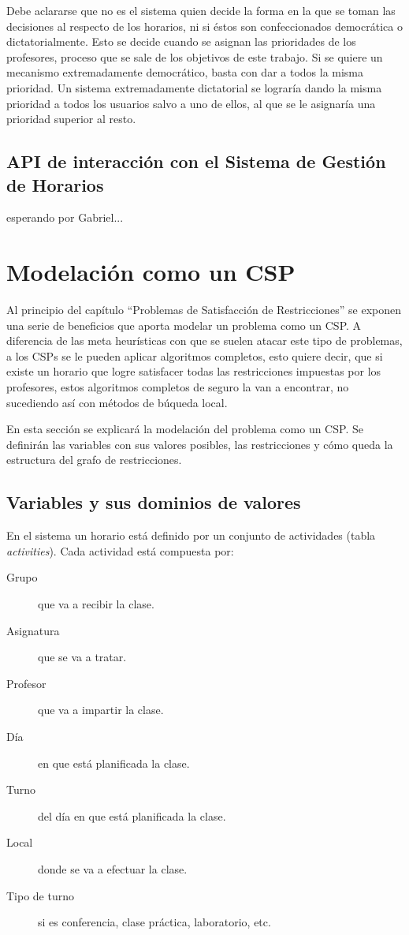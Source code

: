 Debe aclararse que no es el sistema quien decide la forma en la que se toman las decisiones al respecto de los horarios, ni si éstos son confeccionados democrática o dictatorialmente. Esto se decide cuando se asignan las prioridades de los profesores, proceso que se sale de los objetivos de este trabajo. Si se quiere un mecanismo extremadamente democrático, basta con dar a todos la misma prioridad. Un sistema extremadamente dictatorial se lograría dando la misma prioridad a todos los usuarios salvo a uno de ellos, al que se le asignaría una prioridad superior al resto.

\subsection{API de interacci\'on con el Sistema de Gesti\'on de Horarios}

esperando por Gabriel...

\section{Modelaci\'on como un CSP}

Al principio del cap\'itulo ``Problemas de Satisfacción de Restricciones'' se exponen una serie de beneficios que aporta modelar un problema como un CSP. A diferencia de las meta heur\'isticas con que se suelen atacar este tipo de problemas, a los CSPs se le pueden aplicar algoritmos completos, esto quiere decir, que si existe un horario que logre satisfacer todas las restricciones impuestas por los profesores, estos algoritmos completos de seguro la van a encontrar, no sucediendo as\'i con m\'etodos de b\'uqueda local.

En esta secci\'on se explicar\'a la modelaci\'on del problema como un CSP. Se definir\'an las variables con sus valores posibles, las restricciones y c\'omo queda la estructura del grafo de restricciones.

\subsection{Variables y sus dominios de valores}

En el sistema un horario est\'a definido por un conjunto de actividades (tabla \emph{activities}). Cada actividad est\'a compuesta por:

\begin{description}
	\item[Grupo] que va a recibir la clase.
	\item[Asignatura] que se va a tratar.
	\item[Profesor] que va a impartir la clase.
	\item[D\'ia] en que está planificada la clase.
	\item[Turno] del d\'ia en que está planificada la clase.
	\item[Local] donde se va a efectuar la clase.
	\item[Tipo de turno] si es conferencia, clase pr\'actica, laboratorio, etc.
\end{description}

